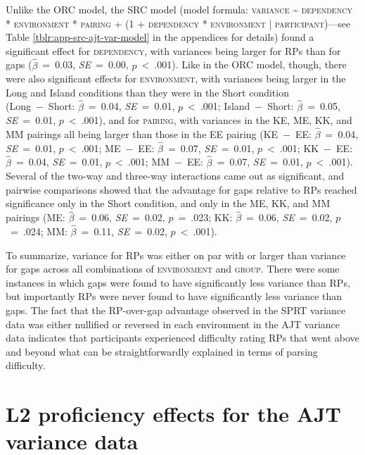 Unlike the ORC model, the SRC model (model formula: \textsc{variance \~{} dependency * environment * pairing + (1 + dependency * environment | participant)}---see Table \ref{tblr:app-src-ajt-var-model} in the appendices for details) found a significant effect for \textsc{dependency}, with variances being larger for RPs than for gaps ($\hat{\beta}$~=~0.03, \textit{SE}~=~0.00, $p$~<~.001). Like in the ORC model, though, there were also significant effects for \textsc{environment}, with variances being larger in the Long and Island conditions than they were in the Short condition (Long~−~Short: $\hat{\beta}$~=~0.04, \textit{SE}~=~0.01, $p$~<~.001; Island~−~Short: $\hat{\beta}$~=~0.05, \textit{SE}~=~0.01, $p$~<~.001), and for \textsc{pairing}, with variances in the KE, ME, KK, and MM pairings all being larger than those in the EE pairing (KE~−~EE: $\hat{\beta}$~=~0.04, \textit{SE}~=~0.01, $p$~<~.001; ME~−~EE: $\hat{\beta}$~=~0.07, \textit{SE}~=~0.01, $p$~<~.001; KK~−~EE: $\hat{\beta}$~=~0.04, \textit{SE}~=~0.01, $p$~<~.001; MM~−~EE: $\hat{\beta}$~=~0.07, \textit{SE}~=~0.01, $p$~<~.001). Several of the two-way and three-way interactions came out as significant, and pairwise comparisons showed that the advantage for gaps relative to RPs reached significance only in the Short condition, and only in the ME, KK, and MM pairings (ME: $\hat{\beta}$~=~0.06, \textit{SE}~=~0.02, $p$~=~.023; KK: $\hat{\beta}$~=~0.06, \textit{SE}~=~0.02, $p$~=~.024; MM: $\hat{\beta}$~=~0.11, \textit{SE}~=~0.02, $p$~<~.001).

To summarize, variance for RPs was either on par with or larger than variance for gaps across all combinations of \textsc{environment} and \textsc{group}. There were some instances in which gaps were found to have significantly less variance than RPs, but importantly RPs were never found to have significantly less variance than gaps. The fact that the RP-over-gap advantage observed in the SPRT variance data was either nullified or reversed in each environment in the AJT variance data indicates that participants experienced difficulty rating RPs that went above and beyond what can be straightforwardly explained in terms of parsing difficulty. 

\section{L2 proficiency effects for the AJT variance data}\label{var-ajt-proficiency}

